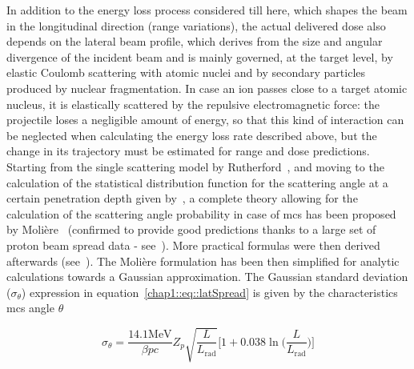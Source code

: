 In addition to the energy loss process considered till here,   which shapes the beam in the longitudinal direction (range variations), the actual delivered dose also depends on the lateral beam profile, which derives from the size and angular divergence of the incident beam and is mainly governed, at the target level, by elastic Coulomb scattering with atomic nuclei and by secondary particles produced by nuclear fragmentation. 
In case an ion passes close to a target atomic nucleus, it is elastically scattered by the repulsive electromagnetic force: the projectile loses a negligible amount of energy, so that this kind of interaction can be neglected when calculating the energy loss rate described above, but the change in its trajectory must be estimated for range and dose predictions. %
Starting from the single scattering model by Rutherford~\parencite{Rutherford1911}, and moving to the calculation of the statistical distribution function for the scattering angle at a certain penetration depth given by~\cite{Bothe1921}, a complete theory allowing for the calculation of the scattering angle probability in case of \gls{mcs} has been proposed by Moli\`{e}re~\parencite{Moliere1948} (confirmed to provide good predictions thanks to a large set of proton beam spread data - see~\cite{Gottschalk1993}). More practical formulas were then derived afterwards (see~\cite{Lewis1950, Highland1975, Gottschalk2010}). The Moli\`{e}re formulation has been then simplified for analytic calculations towards a Gaussian approximation. The Gaussian standard deviation ($\sigma_{\theta}$) expression in equation~\ref{chap1::eq::latSpread} is given by the characteristics \gls{mcs} angle $\theta$~\parencite{Highland1975}

\begin{equation}
\sigma_{\theta} = \frac{14.1 \mathrm{MeV}}{\beta p c}Z_{p}\sqrt{\frac{L}{L_\mathrm{rad}}}\big[1+0.038 \ln\big(\frac{L}{L_{\mathrm{rad}}}\big) \big]
\label{chap1::eq::latSpread}
\end{equation}

